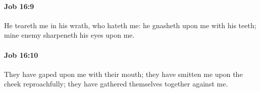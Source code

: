 		\paragraph{Job 16:9} %
			\label{JOB-16-9}

			He teareth me in his wrath, who hateth me: he gnasheth upon me with his teeth; mine enemy sharpeneth his eyes upon me.


		\paragraph{Job 16:10} %
			\label{JOB-16-10}

			They have gaped upon me with their mouth; they have smitten me upon the cheek reproachfully; they have gathered themselves together against me.


